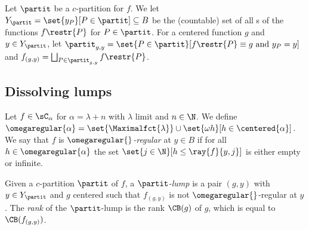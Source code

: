 Let $\partit$ be a $c$-partition for $f$. We let $Y_\partit=\set{y_P}[ P\in \partit]\subseteq B$ be the (countable) set of all \cocenter{}s of the functions $f\restr{P}$ for $P\in \partit$.
For a centered function $g$ and $y\in Y_\partit$, let $\partit_{g,y}=\set{P\in \partit}[f\restr{P}\equiv g \text{ and } y_P=y]$ and $f_{(g,y)}=\bigsqcup_{P\in \partit_{g,y}}f\restr{P}$.

\subsection{Dissolving lumps}

Let $f\in \sC_{\alpha}$ for $\alpha=\lambda+n$ with $\lambda$ limit and $n\in \N$. We define $\omegaregular{\alpha}=\set{\Maximalfct{\lambda}}\cup \set{\omega h }[h\in\centered{\alpha}]$. 
We say that $f$ is \emph{$\omegaregular{}$-regular} at $y\in B$ if for all $h\in \omegaregular{\alpha}$ the set $\set{j\in \N}[ h\leq \ray{f}{y,j}]$ is either empty or infinite. 

Given a $c$-partition $\partit$ of $f$, a \emph{$\partit$-lump} is a pair $(g,y)$ with $y\in Y_\partit$ and $g$ centered such that $f_{(g,y)}$ is not $\omegaregular{}$-regular at $y$.
The \emph{rank} of the $\partit$-lump is the rank $\CB(g)$ of $g$, which is equal to $\CB(f_{(g,y)})$.

\medskip

